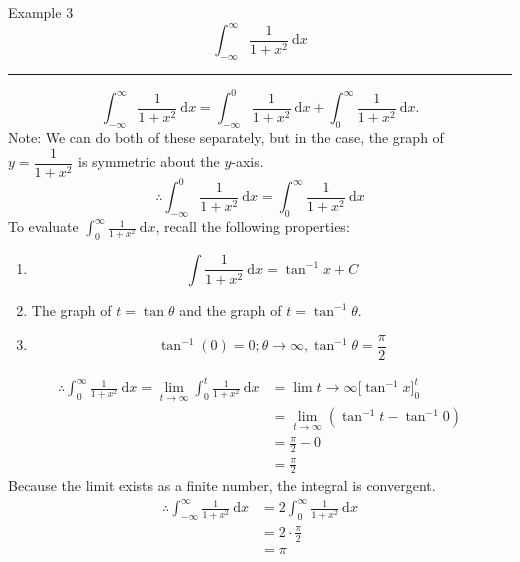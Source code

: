 \documentclass[12pt,a4paper]{article}
\def\d{{\mathrm{d}}}
\begin{document}
\begin{eg}{Example 3}
	$$\int_{-\infty}^\infty\frac{1}{1+x^2}\ \d x$$
	\noindent\rule[0.25\baselineskip]{\textwidth}{1pt}
	$$\int_{-\infty}^\infty\frac{1}{1+x^2}\ \d x=\int_{-\infty}^0\frac{1}{1+x^2}\ \d x+\int_{0}^\infty\frac{1}{1+x^2}\ \d x.$$
	Note: We can do both of these separately, but in the case, the graph of $y=\dfrac{1}{1+x^2}$ is symmetric about the $y$-axis.
	$$\therefore \int_{-\infty}^0\frac{1}{1+x^2}\ \d x=\int_{0}^\infty\frac{1}{1+x^2}\ \d x$$
	To evaluate $\displaystyle\int_{0}^\infty\frac{1}{1+x^2}\ \d x$, recall the following properties: 
	\begin{enumerate}
		\item $$\int\frac{1}{1+x^2}\ \d x=\tan^{-1}{x}+C$$
		\item The graph of $t=\tan\theta$ and the graph of $t=\tan^{-1}\theta$.
		\item $$\tan^{-1}(0)=0; \theta\to\infty, \tan^{-1}\theta=\frac{\pi}{2}$$
	\end{enumerate}
	$$\begin{aligned}
		\therefore \int_{0}^\infty\frac{1}{1+x^2}\ \d x=\lim_{t\to\infty}\int_0^t\frac{1}{1+x^2}\ \d x&=\lim{t\to\infty}\bigg[\tan^{-1}x\bigg]^t_0\\
		&=\lim_{t\to\infty}\left(\tan^{-1}t-\tan^{-1}0\right)\\
		&=\frac{\pi}{2}-0\\
		&=\frac{\pi}{2}
	\end{aligned}$$
	Because the limit exists as a finite number, the integral is convergent. 
	$$\begin{aligned}
		\therefore\int_{-\infty}^\infty\frac{1}{1+x^2}\ \d x&=2\int_{0}^\infty\frac{1}{1+x^2}\ \d x\\
		&=2\cdot\frac{\pi}{2}\\
		&=\pi
	\end{aligned}$$
\end{eg}
\end{document}
